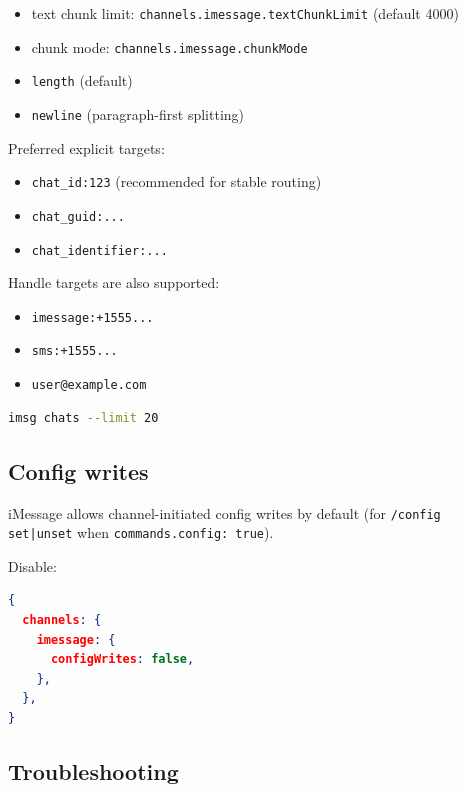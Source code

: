 \begin{itemize}
  \item text chunk limit: \texttt{channels.imessage.textChunkLimit} (default 4000)
  \item chunk mode: \texttt{channels.imessage.chunkMode}
  \item \texttt{length} (default)
  \item \texttt{newline} (paragraph-first splitting)
\end{itemize}


Preferred explicit targets:

\begin{itemize}
  \item \texttt{chat\_id:123} (recommended for stable routing)
  \item \texttt{chat\_guid:...}
  \item \texttt{chat\_identifier:...}
\end{itemize}


Handle targets are also supported:

\begin{itemize}
  \item \texttt{imessage:+1555...}
  \item \texttt{sms:+1555...}
  \item \texttt{user@example.com}
\end{itemize}


\begin{lstlisting}[language=bash]
imsg chats --limit 20
\end{lstlisting}



\subsection{Config writes}


iMessage allows channel-initiated config writes by default (for \texttt{/config set|unset} when \texttt{commands.config: true}).

Disable:

\begin{lstlisting}[language=json]
{
  channels: {
    imessage: {
      configWrites: false,
    },
  },
}
\end{lstlisting}


\subsection{Troubleshooting}


